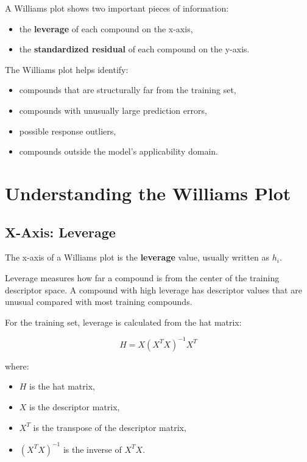\documentclass[11pt]{report}
\newenvironment{Important note}{\begin{quote}\color{red}\textbf{Important note:} }{\end{quote}}
\begin{document}
A Williams plot shows two important pieces of information:

\begin{itemize}[leftmargin=*]
    \item the \textbf{leverage} of each compound on the x-axis,
    \item the \textbf{standardized residual} of each compound on the y-axis.
\end{itemize}

The Williams plot helps identify:

\begin{itemize}[leftmargin=*]
    \item compounds that are structurally far from the training set,
    \item compounds with unusually large prediction errors,
    \item possible response outliers,
    \item compounds outside the model's applicability domain.
\end{itemize}

\section{Understanding the Williams Plot}

\subsection{X-Axis: Leverage}

The x-axis of a Williams plot is the \textbf{leverage} value, usually written as $h_i$.

Leverage measures how far a compound is from the center of the training descriptor space. A compound with high leverage has descriptor values that are unusual compared with most training compounds.

For the training set, leverage is calculated from the hat matrix:

\[
H = X(X^TX)^{-1}X^T
\]

where:

\begin{itemize}[leftmargin=*]
    \item $H$ is the hat matrix,
    \item $X$ is the descriptor matrix,
    \item $X^T$ is the transpose of the descriptor matrix,
    \item $(X^TX)^{-1}$ is the inverse of $X^TX$.
\end{itemize}
\end{document}

